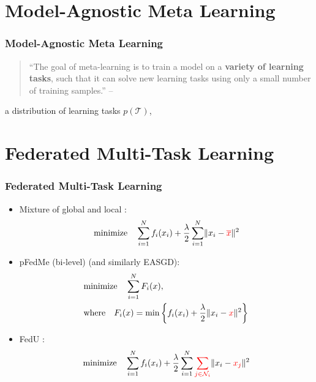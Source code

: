 
\section[MAML]{Model-Agnostic Meta Learning}


\begin{frame}
\frametitle{Model-Agnostic Meta Learning}

\begin{quote}
    ``The goal of meta-learning is to train a model on a {\bfseries variety of learning tasks}, such that it can solve new learning tasks using only a small number of training samples.'' \hfill -- \cite{finn2017maml}
\end{quote}

\vspace{0.6em}

a distribution of learning tasks $p(\mathcal{T})$,

\end{frame}


\section[FMTL]{Federated Multi-Task Learning}


\begin{frame}
\frametitle{Federated Multi-Task Learning}

\begin{itemize}
    \item Mixture of global and local \cite{hanzely2020federated}:
    $$\text{minimize} \quad \sum\limits_{i=1}^N f_i(x_i) + \dfrac{\lambda}{2} \sum\limits_{i=1}^N \lVert x_i - {\color{red} \overline{x}} \rVert^2$$
    \item pFedMe (bi-level) \cite{t2020pfedme} (and similarly EASGD\cite{zhang2015easgd}):
    \begin{align*}
        & \text{minimize} \quad \sum\limits_{i=1}^N F_i(x), \\
        & \text{where} \quad F_i(x) = \min \left\{ f_i(x_i) + \dfrac{\lambda}{2} \lVert x_i - {\color{red} x}\rVert^2 \right\}
    \end{align*}
    \item FedU \cite{dinh2021fedu}:
    $$\text{minimize} \quad \sum\limits_{i=1}^N f_i(x_i) + \dfrac{\lambda}{2} \sum\limits_{i=1}^N {\color{red} \sum\limits_{j\in\mathcal{N}_i}} \lVert x_i - {\color{red} x_j} \rVert^2$$
\end{itemize}

\end{frame}

